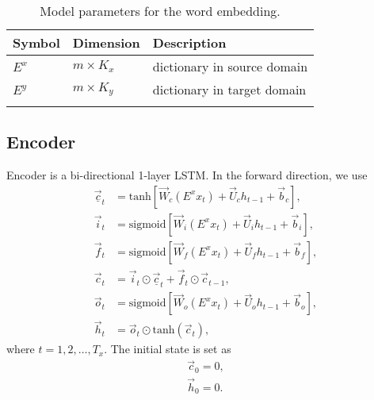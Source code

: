 \documentclass{article}
\begin{document}
\begin{table}[!htb]
\centering
\begin{tabular}{lll}
\toprule
Symbol & Dimension & Description \\
\midrule
$E^x$ & $m \times K_x$ & dictionary in source domain \\
$E^y$ & $m \times K_y$ & dictionary in target domain \\
\bottomrule \\
\end{tabular}
\caption{Model parameters for the word embedding.}
\label{tab:IOModel}
\end{table}




\subsection{Encoder}

	Encoder is a bi-directional 1-layer LSTM. In the forward direction, we use
		\begin{align}
			\overrightarrow{\underline{c}}_t &= \textrm{tanh}\left[ \overrightarrow{W}_c (E^x x_t) + \overrightarrow{U}_c h_{t-1} + \overrightarrow{b}_c \right], \\
			\overrightarrow{i}_t &= \textrm{sigmoid}\left[ \overrightarrow{W}_i (E^x x_t) + \overrightarrow{U}_i h_{t-1} + \overrightarrow{b}_i \right], \\
			\overrightarrow{f}_t &= \textrm{sigmoid}\left[ \overrightarrow{W}_f (E^x x_t) + \overrightarrow{U}_f h_{t-1} + \overrightarrow{b}_f \right], \\
			\overrightarrow{c}_t &= \overrightarrow{i}_t \odot \overrightarrow{\underline{c}}_t + \overrightarrow{f}_t \odot \overrightarrow{c}_{t-1}, \\
			\overrightarrow{o}_t &= \textrm{sigmoid}\left[ \overrightarrow{W}_o (E^x x_t) + \overrightarrow{U}_o h_{t-1} + \overrightarrow{b}_o \right], \\
			\overrightarrow{h}_t &= \overrightarrow{o}_t \odot \textrm{tanh}(\overrightarrow{c}_t),
		\end{align}
		where $t = 1, 2, \dots, T_x$. The initial state is set as
		\begin{align}
			\overrightarrow{c}_0 = 0, \\
			\overrightarrow{h}_0 = 0.
		\end{align}
	
\end{document}

